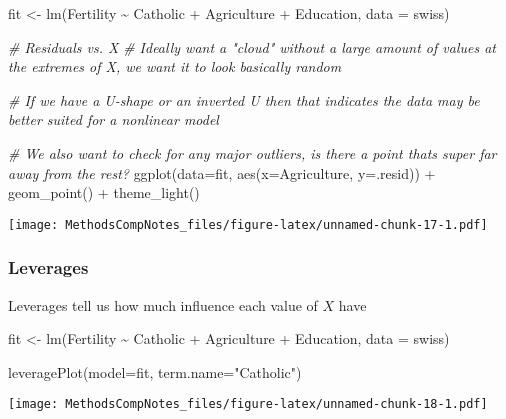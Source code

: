 \documentclass[
]{article}
\newenvironment{Shaded}{\begin{snugshade}}{\end{snugshade}}
\newcommand{\AttributeTok}[1]{\textcolor[rgb]{0.77,0.63,0.00}{#1}}
\newcommand{\CommentTok}[1]{\textcolor[rgb]{0.56,0.35,0.01}{\textit{#1}}}
\newcommand{\FunctionTok}[1]{\textcolor[rgb]{0.00,0.00,0.00}{#1}}
\newcommand{\NormalTok}[1]{#1}
\newcommand{\OtherTok}[1]{\textcolor[rgb]{0.56,0.35,0.01}{#1}}
\newcommand{\SpecialCharTok}[1]{\textcolor[rgb]{0.00,0.00,0.00}{#1}}
\newcommand{\StringTok}[1]{\textcolor[rgb]{0.31,0.60,0.02}{#1}}
\begin{document}
\begin{Shaded}
\begin{Highlighting}[]
\NormalTok{fit }\OtherTok{\textless{}{-}} \FunctionTok{lm}\NormalTok{(Fertility }\SpecialCharTok{\textasciitilde{}}\NormalTok{ Catholic }\SpecialCharTok{+}\NormalTok{ Agriculture }\SpecialCharTok{+}\NormalTok{ Education, }\AttributeTok{data =}\NormalTok{ swiss)}


\CommentTok{\# Residuals vs. X}
\CommentTok{\# Ideally want a "cloud" without a large amount of values at the extremes of X, we want it to look basically random}

\CommentTok{\# If we have a U{-}shape or an inverted U then that indicates the data may be better suited for a nonlinear model}

\CommentTok{\# We also want to check for any major outliers, is there a point that\textquotesingle{}s super far away from the rest?}
\FunctionTok{ggplot}\NormalTok{(}\AttributeTok{data=}\NormalTok{fit, }\FunctionTok{aes}\NormalTok{(}\AttributeTok{x=}\NormalTok{Agriculture, }\AttributeTok{y=}\NormalTok{.resid)) }\SpecialCharTok{+} 
  \FunctionTok{geom\_point}\NormalTok{() }\SpecialCharTok{+}
  \FunctionTok{theme\_light}\NormalTok{()}
\end{Highlighting}
\end{Shaded}

\texttt{[image: MethodsCompNotes\_files/figure-latex/unnamed-chunk-17-1.pdf]}

\hypertarget{leverages}{%
\subsubsection{Leverages}\label{leverages}}

Leverages tell us how much influence each value of \(X\) have

\begin{Shaded}
\begin{Highlighting}[]
\NormalTok{fit }\OtherTok{\textless{}{-}} \FunctionTok{lm}\NormalTok{(Fertility }\SpecialCharTok{\textasciitilde{}}\NormalTok{ Catholic }\SpecialCharTok{+}\NormalTok{ Agriculture }\SpecialCharTok{+}\NormalTok{ Education, }\AttributeTok{data =}\NormalTok{ swiss)}

\FunctionTok{leveragePlot}\NormalTok{(}\AttributeTok{model=}\NormalTok{fit, }\AttributeTok{term.name=}\StringTok{"Catholic"}\NormalTok{)}
\end{Highlighting}
\end{Shaded}

\texttt{[image: MethodsCompNotes\_files/figure-latex/unnamed-chunk-18-1.pdf]}
\end{document}
